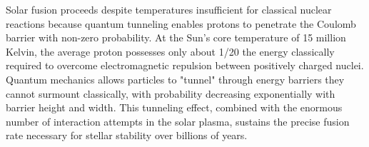 Solar fusion proceeds despite temperatures insufficient for classical nuclear reactions because quantum tunneling enables protons to penetrate the Coulomb barrier with non-zero probability. At the Sun's core temperature of 15 million Kelvin, the average proton possesses only about 1/20 the energy classically required to overcome electromagnetic repulsion between positively charged nuclei. Quantum mechanics allows particles to "tunnel" through energy barriers they cannot surmount classically, with probability decreasing exponentially with barrier height and width. This tunneling effect, combined with the enormous number of interaction attempts in the solar plasma, sustains the precise fusion rate necessary for stellar stability over billions of years.

